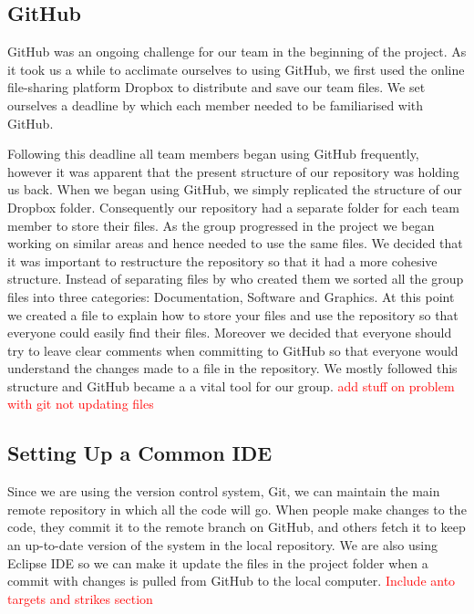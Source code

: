 \documentclass{article}
\begin{document}
	
	\subsection{GitHub}
    
    GitHub was an ongoing challenge for our team in the beginning of the project. As it took us a while to acclimate ourselves to using GitHub, we first used the online file-sharing platform Dropbox to distribute and save our team files. We set ourselves a deadline by which each member needed to be familiarised with GitHub.
    
    Following this deadline all team members began using GitHub frequently, however it was apparent that the present structure of our repository was holding us back. When we began using GitHub, we simply replicated the structure of our Dropbox folder. Consequently our repository had a separate folder for each team member to store their files. As the group progressed in the project we began working on similar areas and hence needed to use the same files. We decided that it was important to restructure the repository so that it had a more cohesive structure. Instead of separating files by who created them we sorted all the group files into three categories: Documentation, Software and Graphics. At this point we created a file to explain how to store your files and use the repository so that everyone could easily find their files. Moreover we decided that everyone should try to leave clear comments when committing to GitHub so that everyone would understand the changes made to a file in the repository. We mostly followed this structure and GitHub became a a vital tool for our group. 
    \textcolor{red}{add stuff on problem with git not updating files}
   
   	\subsection{Setting Up a Common IDE}
   	
   	Since we are using the version control system, Git, we can maintain the main remote repository in which all the code will go. 
   	When people make changes to the code, they commit it to the remote branch on GitHub, and others fetch it to keep an up-to-date version of the system in the local repository. 
   	We are also using Eclipse IDE so we can make it update the files in the project folder when a commit with changes is pulled from GitHub to the local computer.
   	\textcolor{red}{Include anto targets and strikes section}
    
\end{document}
